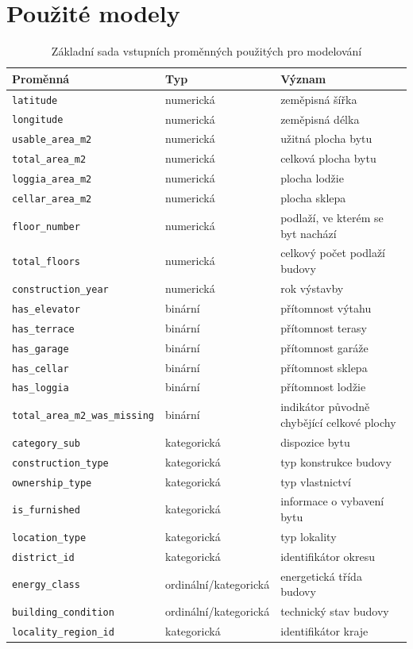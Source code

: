 \section{Použité modely}
\begin{table}[htbp]
\centering
\caption{Základní sada vstupních proměnných použitých pro modelování}
\label{tab:feature_set}
\small
\begin{tabularx}{\textwidth}{l l X}
\toprule
\textbf{Proměnná} & \textbf{Typ} & \textbf{Význam} \\
\midrule
\texttt{latitude} & numerická & zeměpisná šířka \\
\texttt{longitude} & numerická & zeměpisná délka \\
\texttt{usable\_area\_m2} & numerická & užitná plocha bytu \\
\texttt{total\_area\_m2} & numerická & celková plocha bytu \\
\texttt{loggia\_area\_m2} & numerická & plocha lodžie \\
\texttt{cellar\_area\_m2} & numerická & plocha sklepa \\
\texttt{floor\_number} & numerická & podlaží, ve kterém se byt nachází \\
\texttt{total\_floors} & numerická & celkový počet podlaží budovy \\
\texttt{construction\_year} & numerická & rok výstavby \\
\texttt{has\_elevator} & binární & přítomnost výtahu \\
\texttt{has\_terrace} & binární & přítomnost terasy \\
\texttt{has\_garage} & binární & přítomnost garáže \\
\texttt{has\_cellar} & binární & přítomnost sklepa \\
\texttt{has\_loggia} & binární & přítomnost lodžie \\
\texttt{total\_area\_m2\_was\_missing} & binární & indikátor původně chybějící celkové plochy \\
\texttt{category\_sub} & kategorická & dispozice bytu \\
\texttt{construction\_type} & kategorická & typ konstrukce budovy \\
\texttt{ownership\_type} & kategorická & typ vlastnictví \\
\texttt{is\_furnished} & kategorická & informace o vybavení bytu \\
\texttt{location\_type} & kategorická & typ lokality \\
\texttt{district\_id} & kategorická & identifikátor okresu \\
\texttt{energy\_class} & ordinální/kategorická & energetická třída budovy \\
\texttt{building\_condition} & ordinální/kategorická & technický stav budovy \\
\texttt{locality\_region\_id} & kategorická & identifikátor kraje \\
\bottomrule
\end{tabularx}
\end{table}

